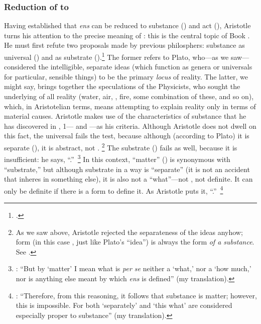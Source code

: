 \subsubsection{Reduction of  to }
\label{sec:aristotle-reduction}

Having established that \emph{ens} can be reduced to substance () and act (), Aristotle turns his attention to the precise meaning of : this is the central topic of Book . He must first refute two proposals made by previous philosphers: substance as universal () and as substrate ().\footcite[See][,~3, 1028b33--35]{aristotle:metaphysics} The former refers to Plato, who---as we saw---considered the intelligible, separate ideas (which function as genera or universals for particular, sensible things) to be the primary \emph{locus} of reality. The latter, we might say, brings together the speculations of the Physicists, who sought the underlying  of all reality (water, air, , fire, some combination of these, and so on), which, in Aristotelian terms, means attempting to explain reality only in terms of material causes. Aristotle makes use of the characteristics of substance that he has discovered in , 1--- and ---as his criteria. Although Aristotle does not dwell on this fact, the universal fails the test, because although (according to Plato) it is separate (), it is abstract, not .%
%
\footnote{As we saw above, Aristotle rejected the separateness of the ideas anyhow; form (in this case , just like Plato's ``idea'') is always the form \emph{of a substance}. See \cite[,~3, 1029a30--33]{aristotle:metaphysics}.}
%
The substrate () fails as well, because it is insufficient: he says, ``.''\,%
%
\footnote{\Cite[,~3, 1029a20]{aristotle:metaphysics}: ``But by `matter' I mean what is \emph{per se} neither a `what,' nor a `how much,' nor is anything else meant by which \emph{ens} is defined'' (my translation).}
%
In this context, ``matter'' () is synonymous with ``substrate,'' but although substrate in a way is ``separate'' (it is not an accident that inheres in something else), it is also not a ``what''---not , not definite. It can only be definite if there is a form to define it. As Aristotle puts it, ``.''\,%
%
\footnote{\Cite[,~3, 1029a28--29]{aristotle:metaphysics}: ``Therefore, from this reasoning, it follows that substance is matter; however, this is impossible. For both `separately' and `this what' are considered especially proper to substance'' (my translation).}
%

